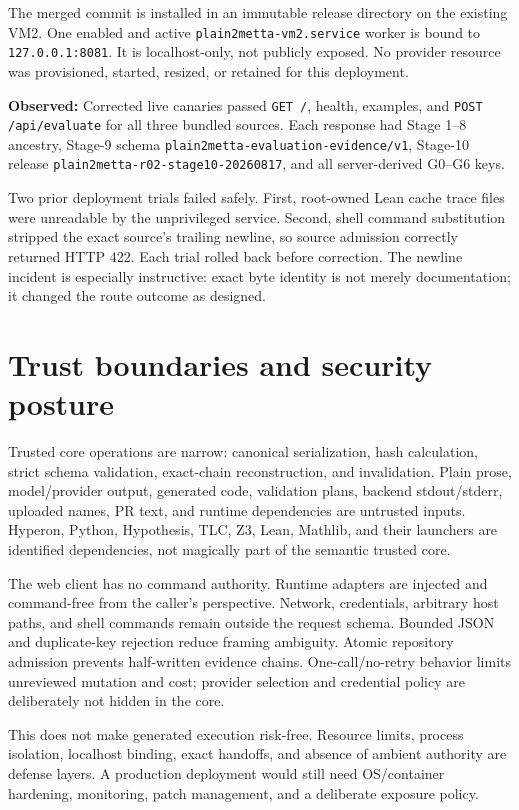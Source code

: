 \documentclass[11pt]{article}
\newcommand{\code}[1]{\texttt{#1}}
\newcommand{\observed}{\textbf{Observed: }}
\begin{document}
The merged commit is installed in an immutable release directory on the
existing VM2.  One enabled and active \code{plain2metta-vm2.service} worker is
bound to \code{127.0.0.1:8081}.  It is localhost-only, not publicly exposed.
No provider resource was provisioned, started, resized, or retained for this
deployment.

\observed Corrected live canaries passed \code{GET /}, health, examples, and
\code{POST /api/evaluate} for all three bundled sources.  Each response had
Stage 1--8 ancestry, Stage-9 schema
\code{plain2metta-evaluation-evidence/v1}, Stage-10 release
\code{plain2metta-r02-stage10-20260817}, and all server-derived G0--G6 keys.

Two prior deployment trials failed safely.  First, root-owned Lean cache trace
files were unreadable by the unprivileged service.  Second, shell command
substitution stripped the exact source's trailing newline, so source admission
correctly returned HTTP 422.  Each trial rolled back before correction.  The
newline incident is especially instructive: exact byte identity is not merely
documentation; it changed the route outcome as designed.

\section{Trust boundaries and security posture}

Trusted core operations are narrow: canonical serialization, hash
calculation, strict schema validation, exact-chain reconstruction, and
invalidation.  Plain prose, model/provider output, generated code, validation
plans, backend stdout/stderr, uploaded names, PR text, and runtime dependencies
are untrusted inputs.  Hyperon, Python, Hypothesis, TLC, Z3, Lean, Mathlib, and
their launchers are identified dependencies, not magically part of the
semantic trusted core.

The web client has no command authority.  Runtime adapters are injected and
command-free from the caller's perspective.  Network, credentials, arbitrary
host paths, and shell commands remain outside the request schema.  Bounded
JSON and duplicate-key rejection reduce framing ambiguity.  Atomic repository
admission prevents half-written evidence chains.  One-call/no-retry behavior
limits unreviewed mutation and cost; provider selection and credential policy
are deliberately not hidden in the core.

This does not make generated execution risk-free.  Resource limits, process
isolation, localhost binding, exact handoffs, and absence of ambient authority
are defense layers.  A production deployment would still need OS/container
hardening, monitoring, patch management, and a deliberate exposure policy.
\end{document}
